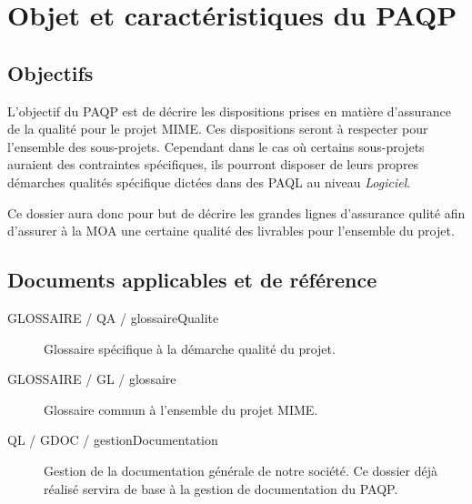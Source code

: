 \documentclass{mise_en_page}
\begin{document}
\maketitle

\begin{historique}
\end{historique}

\newpage

\tableofcontents

\section{Objet et caractéristiques du PAQP}

\subsection{Objectifs}
L’objectif du PAQP est de décrire les dispositions prises en matière d’assurance de la qualité pour le projet MIME. Ces dispositions seront à respecter pour l'ensemble des sous-projets. Cependant dans le cas où certains sous-projets auraient des contraintes spécifiques, ils pourront disposer de leurs propres démarches qualités spécifique dictées dans des PAQL au niveau \emph{Logiciel}.

Ce dossier aura donc pour but de décrire les grandes lignes d'assurance qulité afin d'assurer à la MOA une certaine qualité des livrables pour l'ensemble du projet.

\subsection{Documents applicables et de référence}


\begin{description}
	\item[GLOSSAIRE / QA / glossaireQualite ] Glossaire spécifique à la démarche qualité du projet.
	\item[GLOSSAIRE / GL / glossaire ] Glossaire commun à l'ensemble du projet MIME.
\end{description}


\begin{description}
	\item[QL / GDOC / gestionDocumentation] Gestion de la documentation générale de notre société. Ce dossier déjà réalisé servira de base à la gestion de documentation du PAQP.
\end{description}
\end{document}
